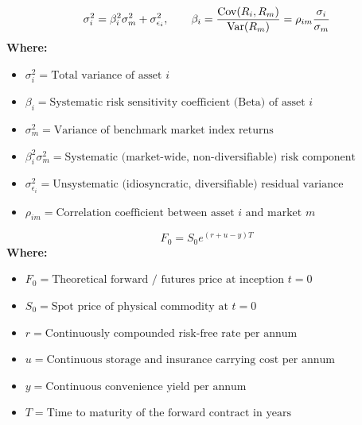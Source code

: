 \begin{formulabox}
\begin{equation}
\sigma_i^2 = \beta_i^2 \sigma_m^2 + \sigma_{\epsilon_i}^2, \qquad \beta_i = \frac{\operatorname{Cov}(R_i, R_m)}{\operatorname{Var}(R_m)} = \rho_{im} \frac{\sigma_i}{\sigma_m}
\end{equation}
\textbf{Where:}
\begin{itemize}[noitemsep, topsep=2pt]
    \item $\sigma_i^2 = \text{Total variance of asset } i$
    \item $\beta_i = \text{Systematic risk sensitivity coefficient (Beta) of asset } i$
    \item $\sigma_m^2 = \text{Variance of benchmark market index returns}$
    \item $\beta_i^2 \sigma_m^2 = \text{Systematic (market-wide, non-diversifiable) risk component}$
    \item $\sigma_{\epsilon_i}^2 = \text{Unsystematic (idiosyncratic, diversifiable) residual variance}$
    \item $\rho_{im} = \text{Correlation coefficient between asset } i \text{ and market } m$
\end{itemize}
\end{formulabox}

\begin{formulabox}
\begin{equation}
F_0 = S_0 e^{(r + u - y)T}
\end{equation}
\textbf{Where:}
\begin{itemize}[noitemsep, topsep=2pt]
    \item $F_0 = \text{Theoretical forward / futures price at inception } t = 0$
    \item $S_0 = \text{Spot price of physical commodity at } t = 0$
    \item $r = \text{Continuously compounded risk-free rate per annum}$
    \item $u = \text{Continuous storage and insurance carrying cost per annum}$
    \item $y = \text{Continuous convenience yield per annum}$
    \item $T = \text{Time to maturity of the forward contract in years}$
\end{itemize}
\end{formulabox}

